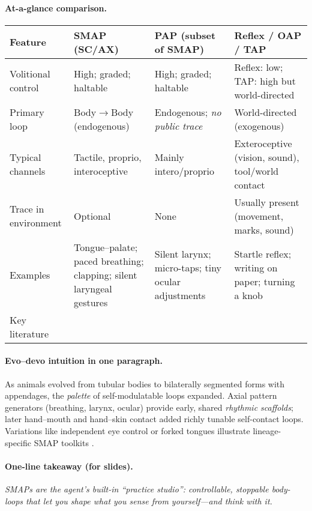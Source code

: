 \paragraph{At-a-glance comparison.}
\begin{adjustwidth}{-2in}{0in}
\begin{center}
\renewcommand{\arraystretch}{1.25}
\begin{tabular}{p{} p{} p{} p{}}
\toprule
\textbf{Feature} & \textbf{SMAP (SC/AX)} & \textbf{PAP (subset of SMAP)} & \textbf{Reflex / OAP / TAP}\\
\midrule
Volitional control & High; graded; haltable & High; graded; haltable & Reflex: low; TAP: high but world-directed\\
Primary loop & Body$\rightarrow$Body (endogenous) & Endogenous; \emph{no public trace} & World-directed (exogenous)\\
Typical channels & Tactile, proprio, interoceptive & Mainly intero/proprio & Exteroceptive (vision, sound), tool/world contact\\
Trace in environment & Optional & None & Usually present (movement, marks, sound)\\
Examples & Tongue–palate; paced breathing; clapping; silent laryngeal gestures & Silent larynx; micro-taps; tiny ocular adjustments & Startle reflex; writing on paper; turning a knob\\
Key literature & \citep{PezzuloCisek2016AffordanceLandscape,Kelso1995DynamicPatterns} & \citep{AldersonDayFernyhough2015InnerSpeech,BlakemoreWolpertFrith1998Tickle} & \citep{Sherrington1906Integrative,Cisek2007AffordanceCompetition}\\
\bottomrule
\end{tabular}
\end{center}
\end{adjustwidth}

\paragraph{Evo–devo intuition in one paragraph.}
As animals evolved from tubular bodies to bilaterally segmented forms with appendages, the \emph{palette} of self-modulatable loops expanded. Axial pattern generators (breathing, larynx, ocular) provide early, shared \emph{rhythmic scaffolds}; later hand–mouth and hand–skin contact added richly tunable self-contact loops. Variations like independent eye control or forked tongues illustrate lineage-specific SMAP toolkits \citep{Carroll2005EndlessForms,LandNilsson2012AnimalEyes,Schwenk1994ForkedTongues}.

\paragraph{One-line takeaway (for slides).}
\emph{SMAPs are the agent’s built-in “practice studio”: controllable, stoppable body-loops that let you shape what you sense from yourself—and think with it.}
